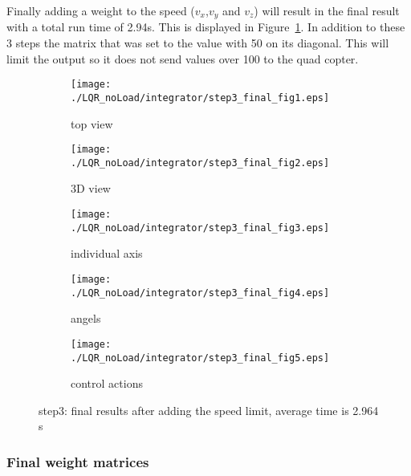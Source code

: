 Finally adding a weight to the speed ($v_x$,$v_y$ and $v_z$) will result in the final result with a total run time of 2.94s. This is displayed in Figure~\ref{fig:step3 integrator}. In addition to these 3 steps the matrix that was set to the value with 50 on its diagonal. This will limit the output so it does not send values over 100 to the quad copter.

\begin{figure}[H]
	\centering
	\begin{subfigure}[b]{0.3\textwidth}
		\texttt{[image: ./LQR\_noLoad/integrator/step3\_final\_fig1.eps]}
		\caption{top view}
	\end{subfigure}
	\begin{subfigure}[b]{0.3\textwidth}
		\texttt{[image: ./LQR\_noLoad/integrator/step3\_final\_fig2.eps]}
		\caption{3D view}
	\end{subfigure}
	\begin{subfigure}[b]{0.3\textwidth}
		\texttt{[image: ./LQR\_noLoad/integrator/step3\_final\_fig3.eps]}
		\caption{individual axis}
	\end{subfigure}
	\begin{subfigure}[b]{0.3\textwidth}
		\texttt{[image: ./LQR\_noLoad/integrator/step3\_final\_fig4.eps]}
		\caption{angels}
	\end{subfigure}
	\begin{subfigure}[b]{0.3\textwidth}
		\texttt{[image: ./LQR\_noLoad/integrator/step3\_final\_fig5.eps]}
		\caption{control actions}
	\end{subfigure}
	\caption{step3: final results after adding the speed limit, average time is 2.964 s}\label{fig:step3 integrator}
\end{figure}


\subsubsection{Final weight matrices}

